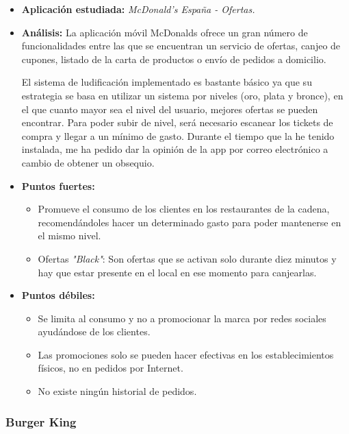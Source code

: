 \documentclass[twoside]{report}
\begin{document}
\begin{itemize}
\item \textbf{Aplicación estudiada:} \cite{mcdo} \textit{McDonald's España - Ofertas.}
\item \textbf{Análisis:} 
La aplicación móvil McDonalds ofrece un gran número de funcionalidades entre las que se encuentran un servicio de ofertas, canjeo de cupones, listado de la carta de productos o envío de pedidos a domicilio. 

El sistema de ludificación implementado es bastante básico ya que su estrategia se basa en utilizar un sistema por niveles (oro, plata y bronce), en el que cuanto mayor sea el nivel del usuario, mejores ofertas se pueden encontrar. Para poder subir de nivel, será necesario escanear los tickets de compra y llegar a un mínimo de gasto. Durante el tiempo que la he tenido instalada, me ha pedido dar la opinión de la app por correo electrónico a cambio de obtener un obsequio.

\item \textbf{Puntos fuertes:}
	\begin{itemize}
	\item Promueve el consumo de los clientes en los restaurantes de la cadena, recomendándoles hacer un determinado gasto para poder mantenerse en el mismo nivel.
	\item Ofertas \textit{"Black"}: Son ofertas que se activan solo durante diez minutos y hay que estar presente en el local en ese momento para canjearlas.
	\end{itemize}
\item \textbf{Puntos débiles:}
	\begin{itemize}
	\item Se limita al consumo y no a promocionar la marca por redes sociales ayudándose de los clientes.
	\item Las promociones solo se pueden hacer efectivas en los establecimientos físicos, no en pedidos por Internet.
	\item No existe ningún historial de pedidos.
	\end{itemize}
\end{itemize}


\subsubsection{Burger King}
\end{document}
